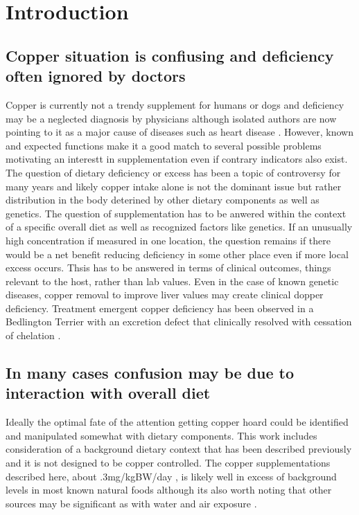 \documentclass[aps,secnumarabic,balancelastpage,amsmath,amssymb,nofootinbib]{revtex4}
\begin{document}
\maketitle
\tableofcontents
\newpage
\newcommand{\mjmguide}[1]{ \subsection{#1}}

\section{Introduction  }
\mjmguide{ Copper situation is confiusing and deficiency often ignored by doctors}
Copper is  currently not a trendy supplement
for humans or dogs
and deficiency may be a neglected  diagnosis  by
physicians 
\cite{PMC10733163}
\cite{Fong_Vij_Vijayan_Copper_deficiency_important_2007}
\cite{Wahab_Mushtaq_Borak_Zincinduced_copper_deficiency_sideroblastic_2020}
\cite{Urtiaga_Terrero_Malumbres_Myelopathy_secondary_copper_2018}
\cite{Goez_Jacob_Fealey_Unusual_Presentation_2011}
\cite{Abdolmohammadi_Sharma_Copper_Deficiency_Forgotten_2011}
although  isolated authors are now pointing to it as a major
cause of diseases such as  heart disease
\cite{DiNicolantonioe000784}
\cite{PMC8838622}
. However,  known and expected functions
make it a good   match to several possible problems 
motivating an interestt in supplementation  even if contrary
indicators also exist.  
The question of dietary deficiency or excess
has been a topic of controversy for many years and likely
copper intake alone is not the dominant issue but rather
distribution in the body deterined by other dietary components
as well as genetics.
The question of supplementation has to be anwered within the context
of a specific overall diet  as well as recognized  factors like genetics.
If an unusually high concentration if measured  in one location, the question
remains if there  would be 
a net benefit reducing deficiency in some other place even if 
more local excess occurs.  
Thsis has to be answered in terms of clinical outcomes,
things relevant to the host, rather than lab values.  
Even in the case of known genetic diseases,
copper removal to improve liver values may create clinical
dopper deficiency. 
Treatment emergent copper deficiency has been observed in 
a Bedlington Terrier with an excretion defect 
that clinically resolved with cessation of chelation 
\cite{Seguin_Bunch_Iatrogenic_copper_deficiency_associated_2001}.

\mjmguide{ In many cases confusion may be due to interaction with overall diet }
Ideally the optimal fate of the attention getting copper hoard
could be identified and manipulated somewhat with dietary components.
This work includes consideration of 
a background dietary context that  has been described
previously
\cite{marchywka-MJM-2021-018-0.50rg}
and it is not designed to be copper controlled.
The copper supplementations described here, about .3mg/kgBW/day ,  is likely
well in excess of background levels in most known natural foods
although its also worth noting that other sources may 
be significant as with water and air exposure 
\cite{Georgopoulos_Wang_Georgopoulos_Assessment_human_exposure_2006}.
\end{document}
